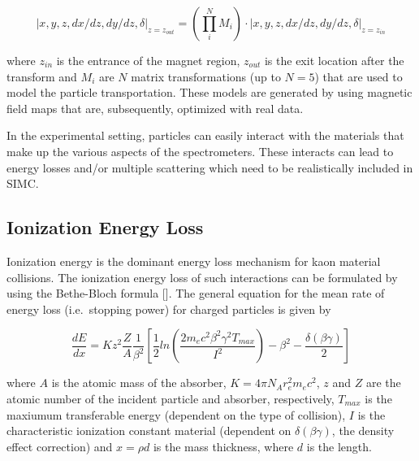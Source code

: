 \documentclass[
]{report}
\begin{document}
\begin{equation} 
  \left|x,y,z,dx/dz,dy/dz,\delta\right|_{z=z_{out}}=(\prod^N_iM_i)\cdot\left|x,y,z,dx/dz,dy/dz,\delta\right|_{z=z_{in}}
  \label{eq:cosy_transform} 
\end{equation}

\noindent where \(z_{in}\) is the entrance of the magnet region,
\(z_{out}\) is the exit location after the transform and \(M_i\) are
\(N\) matrix transformations (up to \(N=5\)) that are used to model the
particle transportation. These models are generated by using magnetic
field maps that are, subsequently, optimized with real data.

\label{Chapter-4-3}

In the experimental setting, particles can easily interact with the
materials that make up the various aspects of the spectrometers. These
interacts can lead to energy losses and/or multiple scattering which
need to be realistically included in SIMC.

\hypertarget{ionization-energy-loss}{%
\subsection{Ionization Energy Loss}\label{ionization-energy-loss}}

Ionization energy is the dominant energy loss mechanism for kaon
material collisions. The ionization energy loss of such interactions can
be formulated by using the Bethe-Bloch formula
{[}\cite{gmp_collaboration_ionization_2015}{]}. The general equation for
the mean rate of energy loss (i.e.~stopping power) for charged particles
is given by

\begin{equation} 
  \frac{dE}{dx}=Kz^2\frac{Z}{A}\frac{1}{\beta^2}[\frac{1}{2}ln(\frac{2m_ec^2\beta^2\gamma^2T_{max}}{I^2})-\beta^2-\frac{\delta(\beta\gamma)}{2}]
  \label{eq:stop_power} 
\end{equation}

\noindent where \(A\) is the atomic mass of the absorber,
\(K=4\pi N_Ar^2_em_ec^2\), \(z\) and \(Z\) are the atomic number of the
incident particle and absorber, respectively, \(T_{max}\) is the
maxiumum transferable energy (dependent on the type of collision), \(I\)
is the characteristic ionization constant material (dependent on
\(\delta(\beta\gamma)\), the density effect correction) and \(x=\rho d\)
is the mass thickness, where \(d\) is the length.
\end{document}
